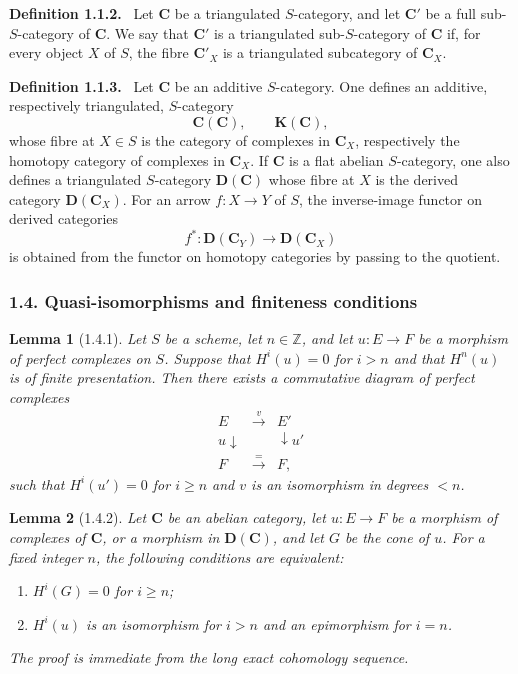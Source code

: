 \documentclass[14pt]{extarticle}
\newcommand{\ZZ}{\mathbb Z}
\newenvironment{statement}[1]{\par\medskip\noindent\textbf{#1.}\ }{\par\medskip}
\newtheorem*{lemma*}{Lemma}
\begin{document}
\begin{statement}{Definition 1.1.2}
Let $\mathbf C$ be a triangulated $S$-category, and let $\mathbf C'$ be a full sub-$S$-category of $\mathbf C$. We say that $\mathbf C'$ is a triangulated sub-$S$-category of $\mathbf C$ if, for every object $X$ of $S$, the fibre $\mathbf C'_X$ is a triangulated subcategory of $\mathbf C_X$.
\end{statement}

\begin{statement}{Definition 1.1.3}
Let $\mathbf C$ be an additive $S$-category. One defines an additive, respectively triangulated, $S$-category
\[
   \mathbf C(\mathbf C),\qquad \mathbf K(\mathbf C),
\]
whose fibre at $X\in S$ is the category of complexes in $\mathbf C_X$, respectively the homotopy category of complexes in $\mathbf C_X$. If $\mathbf C$ is a flat abelian $S$-category, one also defines a triangulated $S$-category $\mathbf D(\mathbf C)$ whose fibre at $X$ is the derived category $\mathbf D(\mathbf C_X)$. For an arrow $f:X\to Y$ of $S$, the inverse-image functor on derived categories
\[
   f^*:\mathbf D(\mathbf C_Y)\longrightarrow\mathbf D(\mathbf C_X)
\]
is obtained from the functor on homotopy categories by passing to the quotient.
\end{statement}

\subsubsection*{1.4. Quasi-isomorphisms and finiteness conditions}

\begin{lemma*}[1.4.1]
Let $S$ be a scheme, let $n\in\ZZ$, and let $u:E\to F$ be a morphism of perfect complexes on $S$. Suppose that $H^i(u)=0$ for $i>n$ and that $H^n(u)$ is of finite presentation. Then there exists a commutative diagram of perfect complexes
\[
\begin{array}{ccc}
E & \xrightarrow{v} & E'\\
u\downarrow & & \downarrow u'\\
F & \xrightarrow{=} & F,
\end{array}
\]
such that $H^i(u')=0$ for $i\ge n$ and $v$ is an isomorphism in degrees $<n$.
\end{lemma*}

\begin{lemma*}[1.4.2]
Let $\mathbf C$ be an abelian category, let $u:E\to F$ be a morphism of complexes of $\mathbf C$, or a morphism in $\mathbf D(\mathbf C)$, and let $G$ be the cone of $u$. For a fixed integer $n$, the following conditions are equivalent:
\begin{enumerate}[label=(\roman*)]
\item $H^i(G)=0$ for $i\ge n$;
\item $H^i(u)$ is an isomorphism for $i>n$ and an epimorphism for $i=n$.
\end{enumerate}
The proof is immediate from the long exact cohomology sequence.
\end{lemma*}
\end{document}
